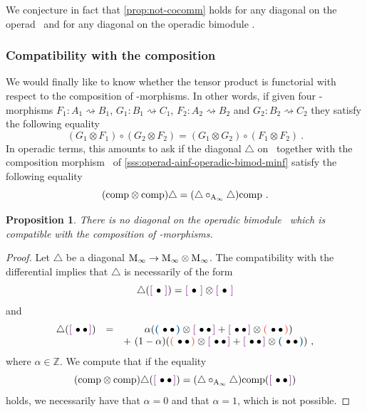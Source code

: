\documentclass[10pt]{amsart}
\newtheorem{proposition}[definition]{Proposition}
\theoremstyle{remark}
\begin{document}
\noindent We conjecture in fact that \cref{prop:not-cocomm} holds for any diagonal on the operad \Ainf\ and for any diagonal on the operadic bimodule \Minf .
 
\subsubsection{Compatibility with the composition} \label{sss:comp-composition}

We would finally like to know whether the tensor product is functorial with respect to the composition of \Ainf -morphisms. 
In other words, if given four \Ainf -morphisms $F_1 : A_1 \rightsquigarrow B_1$, 
$G_1 : B_1 \rightsquigarrow C_1$, $F_2 : A_2 \rightsquigarrow B_2$ and
$G_2 : B_2 \rightsquigarrow C_2$ they satisfy the following equality
\[ ( G_1 \otimes F_1) \circ (G_2 \otimes F_2) = (G_1 \otimes G_2) \circ (F_1 \otimes F_2) \ . \]
In operadic terms, this amounts to ask if the diagonal $\triangle$ on \Minf\ together with the composition morphism \comp\ of \cref{sss:operad-ainf-operadic-bimod-minf} satisfy the following equality 
\[ ( \mathrm{comp} \otimes \mathrm{comp} ) \triangle = (\triangle \circ_{\mathrm{A}_\infty} \triangle ) \mathrm{comp}   \ . \]

\begin{proposition} 
  \label{thm:nofunctorial}
  There is no diagonal on the operadic bimodule \Minf\ which is compatible with the composition of \Ainf -morphisms.  
\end{proposition}

\begin{proof} 
  Let $\triangle$ be a diagonal $\mathrm{M}_\infty \rightarrow \mathrm{M}_\infty \otimes \mathrm{M}_\infty$.
  The compatibility with the differential implies that $\triangle$ is necessarily of the form
  \[
      \triangle(\purple{\bullet }) = \purple{\bullet } \otimes \purple{\bullet } \]
and
\[ \begin{matrix}
      \triangle (\purple{\bullet \bullet }) &= &\alpha (\blue{\bullet \bullet }\otimes \purple{\bullet \bullet } + \purple{\bullet \bullet }\otimes\red{\bullet \bullet }) \\ & &+ \ (1-\alpha)(\red{\bullet \bullet }\otimes \purple{\bullet \bullet }+\purple{\bullet \bullet}\otimes \blue{\bullet \bullet}) \ ,
  \end{matrix} \]
  where $\alpha \in \mathbb{Z}$.
  We compute that if the equality
  \[ ( \comp \otimes \comp ) \triangle ( \purple{\bullet \bullet} ) = (\triangle \circ_{\Ainf} \triangle ) \comp  ( \purple{\bullet \bullet} ) \]
  holds, we necessarily have that $\alpha = 0$ and that $\alpha =1$, which is not possible.
\end{proof}
\end{document}
